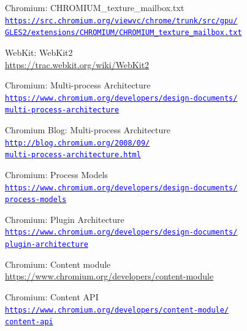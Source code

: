 \documentclass[12pt]{report}
\let\orighref\href
\renewcommand{\href}[2]{%
    \orighref{#1}{\textcolor{blue}{\texttt{#2}}}
}
\let\origurl\url
\renewcommand{\url}[1]{%
    \textcolor{blue}{\origurl{#1}}
}
\begin{document}
\begin{thebibliography}{9}
        Chromium: CHROMIUM\_texture\_mailbox.txt \\
        \href{https://src.chromium.org/viewvc/chrome/trunk/src/gpu/GLES2/extensions/CHROMIUM/CHROMIUM_texture_mailbox.txt}
        {https://src.chromium.org/viewvc/chrome/trunk/src/gpu/\\
        GLES2/extensions/CHROMIUM/CHROMIUM\_texture\_mailbox.txt}

        WebKit: WebKit2 \\
        \url{https://trac.webkit.org/wiki/WebKit2}

        Chromium: Multi-process Architecture \\
        \href{https://www.chromium.org/developers/design-documents/multi-process-architecture}
        {https://www.chromium.org/developers/design-documents/\\
        multi-process-architecture}

        Chromium Blog: Multi-process Architecture \\
        \href{http://blog.chromium.org/2008/09/multi-process-architecture.html}
        {http://blog.chromium.org/2008/09/\\
        multi-process-architecture.html}

        Chromium: Process Models \\
        \href{https://www.chromium.org/developers/design-documents/process-models}
        {https://www.chromium.org/developers/design-documents/\\
        process-models}

        Chromium: Plugin Architecture \\
        \href{https://www.chromium.org/developers/design-documents/plugin-architecture}
        {https://www.chromium.org/developers/design-documents/\\
        plugin-architecture}

        Chromium: Content module \\
        \url{https://www.chromium.org/developers/content-module}

        Chromium: Content API \\
        \href{https://www.chromium.org/developers/content-module/content-api}
        {https://www.chromium.org/developers/content-module/\\
        content-api}


\end{thebibliography}
\end{document}
